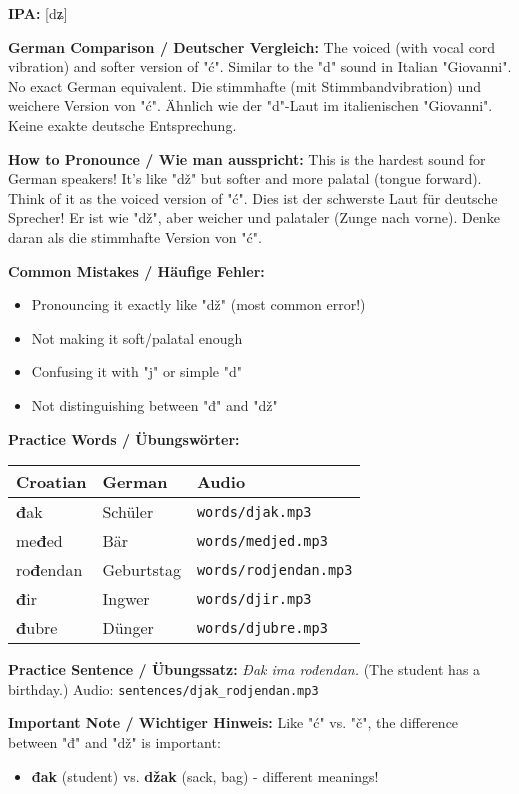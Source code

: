 \begin{tcolorbox}[colback=lightblue!30, colframe=croatianblue, title=\textbf{Đ, đ}]

\textbf{IPA:} [dʑ]

\textbf{German Comparison / Deutscher Vergleich:}
The voiced (with vocal cord vibration) and softer version of "ć". Similar to the "d" sound in Italian "Giovanni". No exact German equivalent.
Die stimmhafte (mit Stimmbandvibration) und weichere Version von "ć". Ähnlich wie der "d"-Laut im italienischen "Giovanni". Keine exakte deutsche Entsprechung.

\textbf{How to Pronounce / Wie man ausspricht:}
This is the hardest sound for German speakers! It's like "dž" but softer and more palatal (tongue forward). Think of it as the voiced version of "ć".
Dies ist der schwerste Laut für deutsche Sprecher! Er ist wie "dž", aber weicher und palataler (Zunge nach vorne). Denke daran als die stimmhafte Version von "ć".

\textbf{Common Mistakes / Häufige Fehler:}
\begin{itemize}
    \item Pronouncing it exactly like "dž" (most common error!)
    \item Not making it soft/palatal enough
    \item Confusing it with "j" or simple "d"
    \item Not distinguishing between "đ" and "dž"
\end{itemize}

\textbf{Practice Words / Übungswörter:}
\begin{tabular}{lll}
\textbf{Croatian} & \textbf{German} & \textbf{Audio} \\
\midrule
\textbf{đ}ak & Schüler & \texttt{words/djak.mp3} \\
me\textbf{đ}ed & Bär & \texttt{words/medjed.mp3} \\
ro\textbf{đ}endan & Geburtstag & \texttt{words/rodjendan.mp3} \\
\textbf{đ}ir & Ingwer & \texttt{words/djir.mp3} \\
\textbf{đ}ubre & Dünger & \texttt{words/djubre.mp3} \\
\end{tabular}

\textbf{Practice Sentence / Übungssatz:}
\textit{Đak ima rođendan.}
(The student has a birthday.)
Audio: \texttt{sentences/djak\_rodjendan.mp3}

\textbf{Important Note / Wichtiger Hinweis:}
Like "ć" vs. "č", the difference between "đ" and "dž" is important:
\begin{itemize}
    \item \textbf{đak} (student) vs. \textbf{džak} (sack, bag) - different meanings!
\end{itemize}

\end{tcolorbox}

